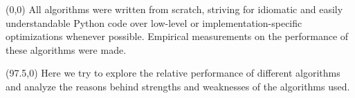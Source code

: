 \begin{textblock}{92.5}(0,0)
\sffamily
\small 
All algorithms were written from scratch, striving for idiomatic and easily understandable Python code over low-level or implementation-specific optimizations whenever possible. Empirical measurements on the performance of these algorithms were made.
\end{textblock}
\begin{textblock}{92.5}(97.5,0) 
  \sffamily \small 
    Here we try to explore the relative performance of different algorithms and analyze the reasons behind strengths and weaknesses of the algorithms used.
\end{textblock}